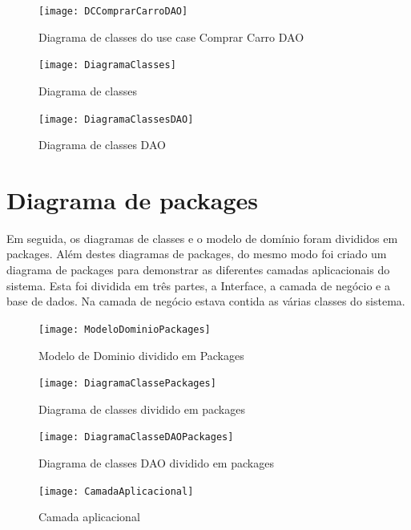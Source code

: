 \documentclass[10pt, a4paper]{report}
\begin{document}
\begin{figure}[!htb]
\centering
\texttt{[image: DCComprarCarroDAO]}
\caption{Diagrama de classes do use case Comprar Carro DAO}
\label{DCCPDAO}
\end{figure}

\begin{figure}[!htb]
\centering
\texttt{[image: DiagramaClasses]}
\caption{Diagrama de classes}
\label{DC}
\end{figure}

\begin{figure}[!htb]
\centering
\texttt{[image: DiagramaClassesDAO]}
\caption{Diagrama de classes DAO}
\label{DC}
\end{figure}


\newpage
\section{Diagrama de packages}
Em seguida, os diagramas de classes e o modelo de domínio foram divididos em packages. Além destes diagramas de packages, do mesmo modo foi criado um diagrama de packages para demonstrar as diferentes camadas aplicacionais do sistema. Esta foi dividida em três partes, a Interface, a camada de negócio e a base de dados. Na camada de negócio estava contida as várias classes do sistema.

\begin{figure}[!htb]
\centering
\texttt{[image: ModeloDominioPackages]}
\caption{Modelo de Dominio dividido em Packages}
\label{MDP}
\end{figure}

\begin{figure}[!htb]
\centering
\texttt{[image: DiagramaClassePackages]}
\caption{Diagrama de classes dividido em packages}
\label{DCP}
\end{figure}

\begin{figure}[!htb]
\centering
\texttt{[image: DiagramaClasseDAOPackages]}
\caption{Diagrama de classes DAO dividido em packages}
\label{DCDAOP}
\end{figure}

\begin{figure}[!htb]
\centering
\texttt{[image: CamadaAplicacional]}
\caption{Camada aplicacional}
\label{CAP}
\end{figure}


\newpage
\end{document}
